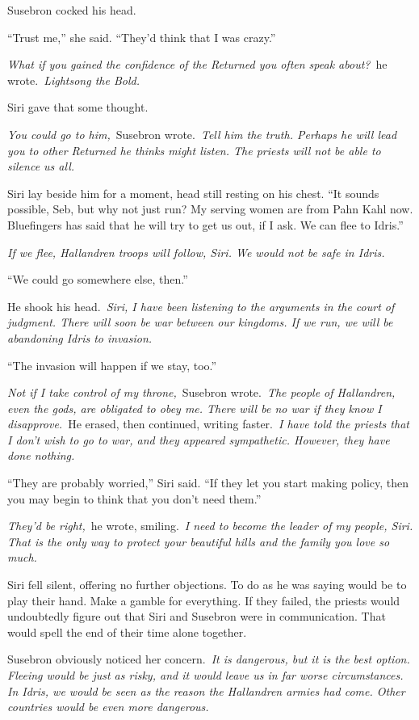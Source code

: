 Susebron cocked his head.

“Trust me,” she said. “They’d think that I was crazy.”

\textit{What if you gained the confidence of the Returned you often speak about?}~he wrote.~\textit{Lightsong the Bold.}

Siri gave that some thought.

\textit{You could go to him,}~Susebron wrote.~\textit{Tell him the truth. Perhaps he will lead you to other Returned he thinks might listen. The priests will not be able to silence us all.}

Siri lay beside him for a moment, head still resting on his chest. “It sounds possible, Seb, but why not just run? My serving women are from Pahn Kahl now. Bluefingers has said that he will try to get us out, if I ask. We can flee to Idris.”

\textit{If we flee, Hallandren troops will follow, Siri. We would not be safe in Idris.}

“We could go somewhere else, then.”

He shook his head.~\textit{Siri, I have been listening to the arguments in the court of judgment. There will soon be war between our kingdoms. If we run, we will be abandoning Idris to invasion.}

“The invasion will happen if we stay, too.”

\textit{Not if I take control of my throne,}~Susebron wrote.~\textit{The people of Hallandren, even the gods, are obligated to obey me. There will be no war if they know I disapprove.}~He erased, then continued, writing faster.~\textit{I have told the priests that I don’t wish to go to war, and they appeared sympathetic. However, they have done nothing.}

“They are probably worried,” Siri said. “If they let you start making policy, then you may begin to think that you don’t need them.”

\textit{They’d be right,}~he wrote, smiling.~\textit{I need to become the leader of my people, Siri. That is the only way to protect your beautiful hills and the family you love so much.}

Siri fell silent, offering no further objections. To do as he was saying would be to play their hand. Make a gamble for everything. If they failed, the priests would undoubtedly figure out that Siri and Susebron were in communication. That would spell the end of their time alone together.

Susebron obviously noticed her concern.~\textit{It is dangerous, but it is the best option. Fleeing would be just as risky, and it would leave us in far worse circumstances. In Idris, we would be seen as the reason the Hallandren armies had come. Other countries would be even more dangerous.}

